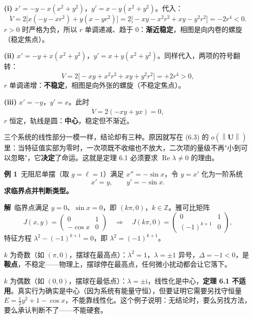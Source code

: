 \documentclass[11pt]{ctexart}
\newcommand{\U}{\mathbf{U}}
\newcommand{\Jac}{J}
\newcommand{\norm}[1]{\left\lVert#1\right\rVert}
\begin{document}
\textbf{(i)} $x'=-y-x(x^{2}+y^{2})$，$y'=x-y(x^{2}+y^{2})$。代入：
\[
\dot V=2\big[x(-y-xr^{2})+y(x-yr^{2})\big]
=2\big[-xy-x^{2}r^{2}+xy-y^{2}r^{2}\big]=-2r^{4}<0 .
\]
$r>0$ 时严格为负，所以 $r$ 单调递减、趋于 $0$：\textbf{渐近稳定}，相图是向内卷的螺旋（稳定焦点）。

\textbf{(ii)} $x'=-y+x(x^{2}+y^{2})$，$y'=x+y(x^{2}+y^{2})$。同样代入，两项的符号翻转：
\[
\dot V=2\big[-xy+x^{2}r^{2}+xy+y^{2}r^{2}\big]=+2r^{4}>0 ,
\]
$r$ 单调递增：\textbf{不稳定}，相图是向外张的螺旋（不稳定焦点）。

\textbf{(iii)} $x'=-y$，$y'=x$。此时
\[
\dot V=2(-xy+yx)=0 ,
\]
$r$ 恒定，轨线是圆：\textbf{中心}，稳定但不渐近。

三个系统的线性部分一模一样，结论却有三种。原因就写在 (6.3) 的 $o(\norm{\U})$ 里：当特征值实部为零时，一次项既不收缩也不放大，二次项的量级不再"小到可以忽略"，它\textbf{决定}了命运。这就是定理 6.1 必须要求 $\operatorname{Re}\lambda\neq0$ 的理由。



\textbf{例 1}\ 无阻尼单摆（取 $g=\ell=1$）满足 $x''=-\sin x$，令 $y=x'$ 化为一阶系统
\[
x'=y,\qquad y'=-\sin x .
\]
\textbf{求临界点并判断类型。}

\textbf{解}\ 临界点满足 $y=0$、$\sin x=0$，即 $(k\pi,0)$，$k\in\mathbb{Z}$。雅可比矩阵
\[
\Jac(x,y)=\begin{pmatrix}0&1\\-\cos x&0\end{pmatrix}
\quad\Longrightarrow\quad
\Jac(k\pi,0)=\begin{pmatrix}0&1\\(-1)^{k+1}&0\end{pmatrix},
\]
特征方程 $\lambda^{2}-(-1)^{k+1}=0$，即 $\lambda^{2}=(-1)^{k+1}$。

$k$ 为奇数（如 $(\pi,0)$，摆球在最高点）：$\lambda^{2}=1$，$\lambda=\pm1$ 异号，$\Delta=-1<0$，是\textbf{鞍点}，不稳定——物理上，摆球停在最高点，任何微小扰动都会让它落下。

$k$ 为偶数（如 $(0,0)$，摆球在最低点）：$\lambda=\pm\mathrm{i}$，线性化是中心，\textbf{定理 6.1 不适用}。真实行为确实是中心（因为系统有能量守恒），但要证明它需要另找守恒量 $E=\frac{1}{2}y^{2}+1-\cos x$，不能靠线性化。这个例子说明：无结论时，要么另找方法，要么承认判断不了——不能硬套。

\end{document}
